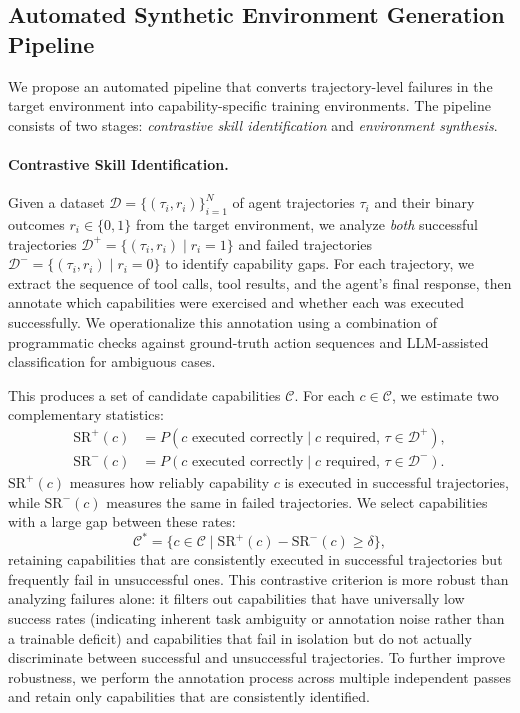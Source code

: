 \subsection{Automated Synthetic Environment Generation Pipeline}

We propose an automated pipeline that converts trajectory-level failures in the
target environment into capability-specific training environments. The pipeline
consists of two stages: \emph{contrastive skill identification} and
\emph{environment synthesis}.

\paragraph{Contrastive Skill Identification.}
Given a dataset $\mathcal{D} = \{(\tau_i, r_i)\}_{i=1}^{N}$ of agent
trajectories $\tau_i$ and their binary outcomes $r_i \in \{0, 1\}$ from the
target environment, we analyze \emph{both} successful trajectories
$\mathcal{D}^{+} = \{(\tau_i, r_i) \mid r_i = 1\}$ and failed trajectories
$\mathcal{D}^{-} = \{(\tau_i, r_i) \mid r_i = 0\}$ to identify capability
gaps. For each trajectory, we extract the sequence of tool calls, tool results,
and the agent's final response, then annotate which capabilities were exercised
and whether each was executed successfully. We operationalize this annotation
using a combination of programmatic checks against ground-truth action
sequences and LLM-assisted classification for ambiguous cases.

This produces a set of candidate capabilities $\mathcal{C}$. For each
$c \in \mathcal{C}$, we estimate two complementary statistics:
\begin{align}
    \text{SR}^{+}(c) &= P(\text{$c$ executed correctly} \mid
        \text{$c$ required}, \, \tau \in \mathcal{D}^{+}), \\
    \text{SR}^{-}(c) &= P(\text{$c$ executed correctly} \mid
        \text{$c$ required}, \, \tau \in \mathcal{D}^{-}).
\end{align}
$\text{SR}^{+}(c)$ measures how reliably capability $c$ is executed in
successful trajectories, while $\text{SR}^{-}(c)$ measures the same in failed
trajectories. We select capabilities with a large gap between these rates:
\begin{equation}
    \mathcal{C}^{*} = \bigl\{c \in \mathcal{C} \;\big|\;
        \text{SR}^{+}(c) - \text{SR}^{-}(c) \geq \delta \bigr\},
\end{equation}
retaining capabilities that are consistently executed in successful trajectories
but frequently fail in unsuccessful ones. This contrastive criterion is more
robust than analyzing failures alone: it filters out capabilities that have
universally low success rates (indicating inherent task ambiguity or annotation
noise rather than a trainable deficit) and capabilities that fail in isolation
but do not actually discriminate between successful and unsuccessful
trajectories. To further improve robustness, we perform the annotation process
across multiple independent passes and retain only capabilities that are
consistently identified.


